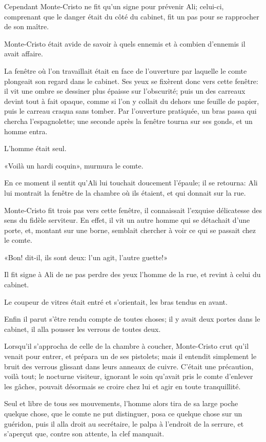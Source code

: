 Cependant Monte-Cristo ne fit qu'un signe pour prévenir Ali; celui-ci, comprenant que le danger était du côté du cabinet, fit un pas pour se rapprocher de son maître. 

Monte-Cristo était avide de savoir à quels ennemis et à combien d'ennemis il avait affaire. 

La fenêtre où l'on travaillait était en face de l'ouverture par laquelle le comte plongeait son regard dans le cabinet. Ses yeux se fixèrent donc vers cette fenêtre: il vit une ombre se dessiner plus épaisse sur l'obscurité; puis un des carreaux devint tout à fait opaque, comme si l'on y collait du dehors une feuille de papier, puis le carreau craqua sans tomber. Par l'ouverture pratiquée, un bras passa qui chercha l'espagnolette; une seconde après la fenêtre tourna sur ses gonds, et un homme entra.  

L'homme était seul. 

«Voilà un hardi coquin», murmura le comte. 

En ce moment il sentit qu'Ali lui touchait doucement l'épaule; il se retourna: Ali lui montrait la fenêtre de la chambre où ils étaient, et qui donnait sur la rue. 

Monte-Cristo fit trois pas vers cette fenêtre, il connaissait l'exquise délicatesse des sens du fidèle serviteur. En effet, il vit un autre homme qui se détachait d'une porte, et, montant sur une borne, semblait chercher à voir ce qui se passait chez le comte. 

«Bon! dit-il, ils sont deux: l'un agit, l'autre guette!» 

Il fit signe à Ali de ne pas perdre des yeux l'homme de la rue, et revint à celui du cabinet. 

Le coupeur de vitres était entré et s'orientait, les bras tendus en avant. 

Enfin il parut s'être rendu compte de toutes choses; il y avait deux portes dans le cabinet, il alla pousser les verrous de toutes deux. 

Lorsqu'il s'approcha de celle de la chambre à coucher, Monte-Cristo crut qu'il venait pour entrer, et prépara un de ses pistolets; mais il entendit simplement le bruit des verrous glissant dans leurs anneaux de cuivre. C'était une précaution, voilà tout; le nocturne visiteur, ignorant le soin qu'avait pris le comte d'enlever les gâches, pouvait désormais se croire chez lui et agir en toute tranquillité. 

Seul et libre de tous ses mouvements, l'homme alors tira de sa large poche quelque chose, que le comte ne put distinguer, posa ce quelque chose sur un guéridon, puis il alla droit au secrétaire, le palpa à l'endroit de la serrure, et s'aperçut que, contre son attente, la clef manquait. 

